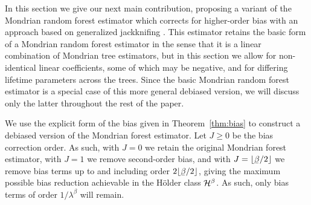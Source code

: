 In this section we give our next main contribution,
proposing a variant of the Mondrian random forest estimator
which corrects for higher-order bias with an approach based on
generalized jackknifing \citep{schucany1977improvement}.
This estimator retains the basic form of a Mondrian random forest estimator
in the sense that it is a linear combination of Mondrian tree estimators,
but in this section we allow for non-identical linear coefficients,
some of which may be negative, and for differing
lifetime parameters across the trees.
Since the basic Mondrian random forest estimator is a special
case of this more general debiased version,
we will discuss only the latter throughout the rest of the paper.

We use the explicit form of the bias given in Theorem~\ref{thm:bias}
to construct a debiased version of the Mondrian forest estimator.
Let $J \geq 0$ be the bias correction order.
As such, with $J=0$ we retain the original Mondrian forest estimator,
with $J=1$ we remove second-order bias,
and with $J = \lfloor\flbeta / 2 \rfloor$ we remove bias terms
up to and including order $2 \lfloor\flbeta / 2 \rfloor$,
giving the maximum possible bias reduction achievable
in the H{\"o}lder class $\mathcal{H}^\beta$.
As such, only bias terms of order $1/\lambda^\beta$ will remain.

